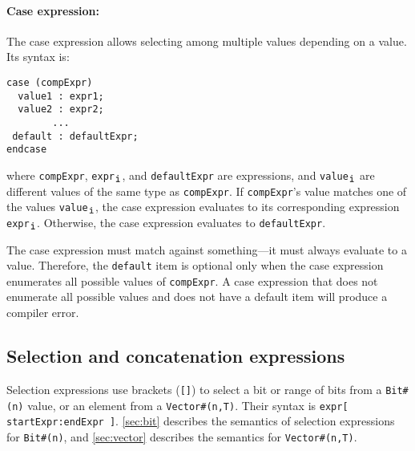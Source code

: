 \paragraph{Case expression:} The case expression allows selecting among multiple values depending on a value. Its syntax is:
\begin{center}
\verb|case (compExpr)           | \\
\verb|  value1 : expr1;         | \\
\verb|  value2 : expr2;         | \\
\verb|        ...               | \\
\verb|| \optStart \verb| default : defaultExpr; |\optEnd \\
\verb|endcase                   |
\end{center}
where \verb|compExpr|, \verb|expr|$_{\verb|i|}$, and \verb|defaultExpr| are expressions,
and \verb|value|$_{\verb|i|}$ are different values of the same type as \verb|compExpr|.
If \verb|compExpr|'s value matches one of the values \verb|value|$_{\verb|i|}$,
the case expression evaluates to its corresponding expression \verb|expr|$_{\verb|i|}$.
Otherwise, the case expression evaluates to \verb|defaultExpr|.

The case expression must match against something---it must always evaluate to a value.
Therefore, the \verb|default| item is optional only when the case expression enumerates
all possible values of \verb|compExpr|.
A case expression that does not enumerate all possible values and does not have a default
item will produce a compiler error.


\subsection{Selection and concatenation expressions}

Selection expressions use brackets (\verb|[]|) to select a bit or range of bits from a \verb|Bit#(n)| value,
or an element from a \verb|Vector#(n,T)|.
Their syntax is \verb|expr[ startExpr|\optStart\verb|:endExpr|\optEnd\verb| ]|.
\autoref{sec:bit} describes the semantics of selection expressions for \verb|Bit#(n)|,
and \autoref{sec:vector} describes the semantics for \verb|Vector#(n,T)|.

